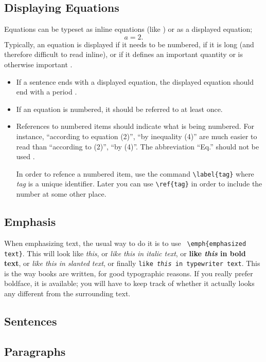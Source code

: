 \subsection{Displaying Equations}

Equations can be typeset as inline equations (like )
or as a displayed equation;
$$a=2.$$
Typically, an equation is displayed if it needs to be numbered,
if it is long (and therefore difficult to read inline), or if it
defines an important quantity or is otherwise important \cite{higham}.
\begin{itemize}
\item If a sentence ends with a displayed equation, the displayed
equation should end with a period \cite{higham}.
\item If an equation is numbered, it should be referred to at least once.
\item
References to numbered items should indicate what is being
numbered. For instance,
``according to equation (2)'', ``by inequality (4)'' are much easier to read
than ``according to (2)'', ``by (4)''.
The abbreviation ``Eq.'' should not be used \cite{higham}.

In order to refence a numbered item, use the command \verb+\label{tag}+
where \emph{tag} is a unique identifier. Later you can use \verb+\ref{tag}+ in order to include the number at some other place.
\end{itemize}



\subsection{Emphasis}

When emphasizing text, the usual way to do it is to use {\tt
\verb|\emph{emphasized text}|}. This will look like \emph{this}, or
\textit{like \emph{this} in italic text}, or \textbf{like \emph{this}
in bold text}, or \textsl{like \emph{this} in slanted text}, or
finally \texttt{like
\emph{this} in typewriter text}. This is the way books are written,
for good typographic reasons. If you really prefer boldface, it is
available; you will have to keep track of whether it actually looks
any different from the surrounding text.

\subsection{Sentences}
\subsection{Paragraphs}

